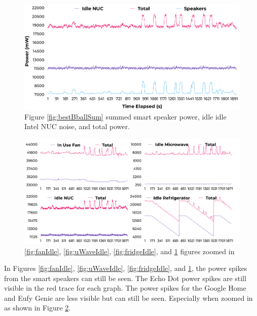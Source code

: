 \begin{figure}[H]
  \centering
  \includegraphics[width=1\textwidth]{figures/idleIntelNUCNoise.png}
  \caption{Figure \ref{fig:bestBballSum} summed smart speaker power, idle idle Intel NUC noise, and total power.}
  \label{fig:nucIdle}
\end{figure}

\begin{figure}[H]
    \centering
    \includegraphics[width=1\textwidth]{figures/allIdleNoise.png}
    \caption{\ref{fig:fanIdle}, \ref{fig:uWaveIdle}, \ref{fig:fridgeIdle}, and \ref{fig:nucIdle} figures zoomed in}
    \label{fig:allIdleNoise}
  \end{figure}

In Figures \ref{fig:fanIdle}, \ref{fig:uWaveIdle}, \ref{fig:fridgeIdle}, and \ref{fig:nucIdle}, the power spikes from the smart speakers can still be seen. The Echo Dot power spikes are still visible in the red trace for each graph. The power spikes for the Google Home and Eufy Genie are less visible but can still be seen. Especially when zoomed in as shown in Figure \ref{fig:allIdleNoise}.


